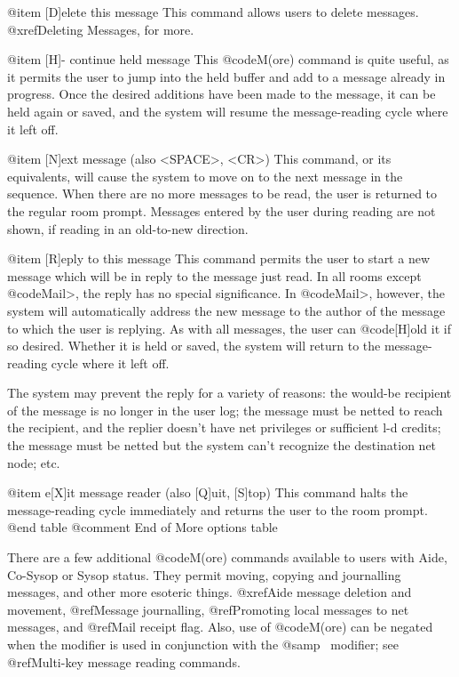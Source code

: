 @item [D]elete this message
This command allows users to delete messages.
@xref{Deleting Messages}, for more.

@item [H]- continue held message
This @code{M(ore)} command is quite useful, as it
permits the user to jump into the held buffer and add
to a message already in progress.  Once the desired
additions have been made to the message, it can be held
again or saved, and the system will resume the message-reading
cycle where it left off.

@item [N]ext message (also <SPACE>, <CR>)
This command, or its equivalents,
will cause the system to move on to the next message
in the sequence.  When
there are no more messages to be read, the user is
returned to the regular room prompt.  Messages entered
by the user during reading are not shown, if reading in
an old-to-new direction.

@item [R]eply to this message
This command permits the user to start a new
message which will be in reply to the message just
read.  In all rooms except @code{Mail>}, the reply has no
special significance.  In @code{Mail>}, however, the system
will automatically address the new message to the
author of the message to which the user is replying.
As with all messages, the user can @code{[H]old} it if so
desired.  Whether it is held or saved, the system will
return to the message-reading cycle where it left off.

The system may prevent the reply for a variety
of reasons:  the would-be recipient of the message is
no longer in the user log; the message must be netted
to reach the recipient, and the replier doesn't have
net privileges or sufficient l-d credits; the message
must be netted but the system can't recognize the
destination net node; etc.

@item e[X]it message reader (also [Q]uit, [S]top)
This command halts the message-reading cycle
immediately and returns the user to the room prompt.
@end table
@comment End of More options table

There are a few additional @code{M(ore)} commands
available to users with Aide, Co-Sysop or Sysop status.  They permit
moving, copying and journalling messages, and other more
esoteric things.
@xref{Aide message deletion and movement}, @ref{Message journalling},
@ref{Promoting local messages to net messages}, and @ref{Mail receipt flag}.
Also, use of @code{M(ore)} can be negated when the
modifier is used in conjunction with the @samp{~} modifier; see
@ref{Multi-key message reading commands}.

